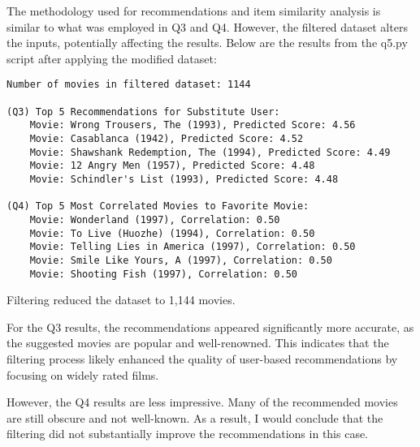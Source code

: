 \documentclass[12pt]{article}
\begin{document}
The methodology used for recommendations and item similarity analysis is similar to what was employed in Q3 and Q4. However, the filtered dataset alters the inputs, potentially affecting the results. Below are the results from the q5.py script after applying the modified dataset:

\begin{verbatim}
Number of movies in filtered dataset: 1144

(Q3) Top 5 Recommendations for Substitute User:
    Movie: Wrong Trousers, The (1993), Predicted Score: 4.56
    Movie: Casablanca (1942), Predicted Score: 4.52
    Movie: Shawshank Redemption, The (1994), Predicted Score: 4.49
    Movie: 12 Angry Men (1957), Predicted Score: 4.48
    Movie: Schindler's List (1993), Predicted Score: 4.48

(Q4) Top 5 Most Correlated Movies to Favorite Movie:
    Movie: Wonderland (1997), Correlation: 0.50
    Movie: To Live (Huozhe) (1994), Correlation: 0.50
    Movie: Telling Lies in America (1997), Correlation: 0.50
    Movie: Smile Like Yours, A (1997), Correlation: 0.50
    Movie: Shooting Fish (1997), Correlation: 0.50
\end{verbatim}

Filtering reduced the dataset to 1,144 movies.

For the Q3 results, the recommendations appeared significantly more accurate, as the suggested movies are popular and well-renowned. This indicates that the filtering process likely enhanced the quality of user-based recommendations by focusing on widely rated films. 

However, the Q4 results are less impressive. Many of the recommended movies are still obscure and not well-known. As a result, I would conclude that the filtering did not substantially improve the recommendations in this case.
\end{document}
